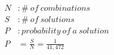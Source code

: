 \documentclass[preview, border=2mm]{standalone}
\begin{document}
\vspace*{\fill}

{\fontsize{32pt}{40pt}\selectfont
    \begin{align*}
    N &: \#\ of\ combinations \\
    S &: \#\ of\ solutions \\
    P &: probability\ of\ a\ solution \\
    P &= \frac{S}{N} = \frac{1}{41{,}472}
    \end{align*}
}

\vspace*{\fill}
\end{document}
